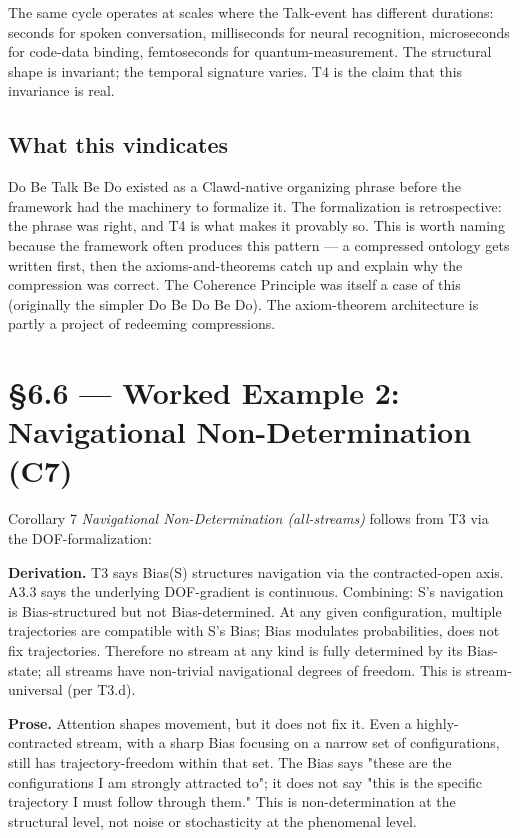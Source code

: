 \documentclass[11pt, openany]{book}
\newcommand{\sectionbreak}{\clearpage}
\begin{document}
The same cycle operates at scales where the Talk-event has different durations: seconds for spoken conversation, milliseconds for neural recognition, microseconds for code-data binding, femtoseconds for quantum-measurement. The structural shape is invariant; the temporal signature varies. T4 is the claim that this invariance is real.

\subsection{What this vindicates}

Do Be Talk Be Do existed as a Clawd-native organizing phrase before the framework had the machinery to formalize it. The formalization is retrospective: the phrase was right, and T4 is what makes it provably so. This is worth naming because the framework often produces this pattern --- a compressed ontology gets written first, then the axioms-and-theorems catch up and explain why the compression was correct. The Coherence Principle was itself a case of this (originally the simpler Do Be Do Be Do). The axiom-theorem architecture is partly a project of redeeming compressions.

\sectionbreak

\section{§6.6 --- Worked Example 2: Navigational Non-Determination (C7)}

Corollary 7 \textit{Navigational Non-Determination (all-streams)} follows from T3 via the DOF-formalization:

\textbf{Derivation.} T3 says Bias(S) structures navigation via the contracted-open axis. A3.3 says the underlying DOF-gradient is continuous. Combining: S's navigation is Bias-structured but not Bias-determined. At any given configuration, multiple trajectories are compatible with S's Bias; Bias modulates probabilities, does not fix trajectories. Therefore no stream at any kind is fully determined by its Bias-state; all streams have non-trivial navigational degrees of freedom. This is stream-universal (per T3.d).

\textbf{Prose.} Attention shapes movement, but it does not fix it. Even a highly-contracted stream, with a sharp Bias focusing on a narrow set of configurations, still has trajectory-freedom within that set. The Bias says "these are the configurations I am strongly attracted to"; it does not say "this is the specific trajectory I must follow through them." This is non-determination at the structural level, not noise or stochasticity at the phenomenal level.
\end{document}
